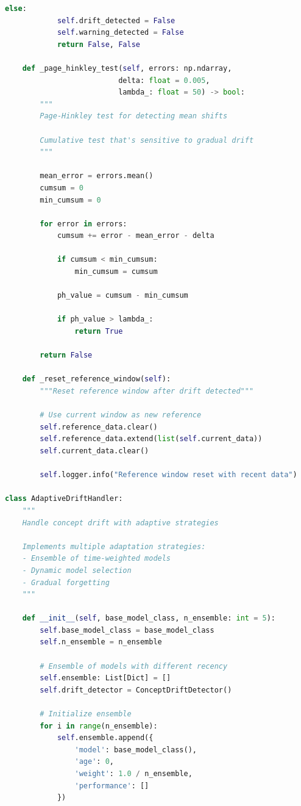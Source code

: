 \begin{lstlisting}[language=Python, caption=Concept Drift Detection and Handling]
        else:
            self.drift_detected = False
            self.warning_detected = False
            return False, False

    def _page_hinkley_test(self, errors: np.ndarray,
                          delta: float = 0.005,
                          lambda_: float = 50) -> bool:
        """
        Page-Hinkley test for detecting mean shifts

        Cumulative test that's sensitive to gradual drift
        """

        mean_error = errors.mean()
        cumsum = 0
        min_cumsum = 0

        for error in errors:
            cumsum += error - mean_error - delta

            if cumsum < min_cumsum:
                min_cumsum = cumsum

            ph_value = cumsum - min_cumsum

            if ph_value > lambda_:
                return True

        return False

    def _reset_reference_window(self):
        """Reset reference window after drift detected"""

        # Use current window as new reference
        self.reference_data.clear()
        self.reference_data.extend(list(self.current_data))
        self.current_data.clear()

        self.logger.info("Reference window reset with recent data")

class AdaptiveDriftHandler:
    """
    Handle concept drift with adaptive strategies

    Implements multiple adaptation strategies:
    - Ensemble of time-weighted models
    - Dynamic model selection
    - Gradual forgetting
    """

    def __init__(self, base_model_class, n_ensemble: int = 5):
        self.base_model_class = base_model_class
        self.n_ensemble = n_ensemble

        # Ensemble of models with different recency
        self.ensemble: List[Dict] = []
        self.drift_detector = ConceptDriftDetector()

        # Initialize ensemble
        for i in range(n_ensemble):
            self.ensemble.append({
                'model': base_model_class(),
                'age': 0,
                'weight': 1.0 / n_ensemble,
                'performance': []
            })


\end{lstlisting}
